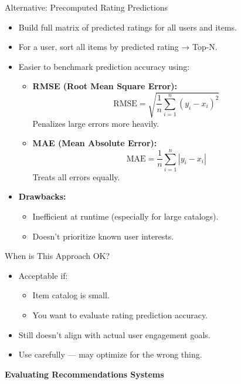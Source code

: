 \documentclass{beamer}
\begin{document}
\begin{frame}{Alternative: Precomputed Rating Predictions}
\begin{itemize}
    \item Build full matrix of predicted ratings for all users and items.
    \item For a user, sort all items by predicted rating → Top-N.
    \item Easier to benchmark prediction accuracy using:
    \begin{itemize}
        \item \textbf{RMSE (Root Mean Square Error):}
        \[
        \text{RMSE} = \sqrt{ \frac{1}{n} \sum_{i=1}^{n} (y_i - x_i)^2 }
        \]
        Penalizes large errors more heavily.
        
        \item \textbf{MAE (Mean Absolute Error):}
        \[
        \text{MAE} = \frac{1}{n} \sum_{i=1}^{n} |y_i - x_i|
        \]
        Treats all errors equally.
    \end{itemize}
    \item \textbf{Drawbacks:}
    \begin{itemize}
        \item Inefficient at runtime (especially for large catalogs).
        \item Doesn’t prioritize known user interests.
    \end{itemize}
\end{itemize}
\end{frame}


\begin{frame}{When is This Approach OK?}
\begin{itemize}
    \item Acceptable if:
    \begin{itemize}
        \item Item catalog is small.
        \item You want to evaluate rating prediction accuracy.
    \end{itemize}
    \item Still doesn’t align with actual user engagement goals.
    \item Use carefully — may optimize for the wrong thing.
\end{itemize}
\end{frame}

\begin{frame}[plain]
    \begin{center}
        {\LARGE \textbf{Evaluating Recommendations Systems}}
    \end{center}
\end{frame}
\end{document}
